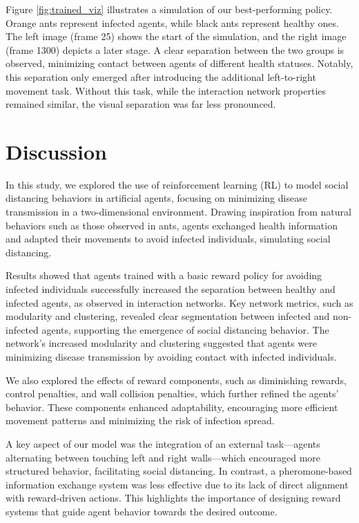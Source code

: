 \documentclass[9pt]{IEEEtran}
\begin{document}
Figure \ref{fig:trained_viz} illustrates a simulation of our best-performing policy. Orange ants represent infected agents, while black ants represent healthy ones. The left image (frame 25) shows the start of the simulation, and the right image (frame 1300) depicts a later stage. A clear separation between the two groups is observed, minimizing contact between agents of different health statuses. Notably, this separation only emerged after introducing the additional left-to-right movement task. Without this task, while the interaction network properties remained similar, the visual separation was far less pronounced.

\section{Discussion}

In this study, we explored the use of reinforcement learning (RL) to model social distancing behaviors in artificial agents, focusing on minimizing disease transmission in a two-dimensional environment. Drawing inspiration from natural behaviors such as those observed in ants, agents exchanged health information and adapted their movements to avoid infected individuals, simulating social distancing. 

Results showed that agents trained with a basic reward policy for avoiding infected individuals successfully increased the separation between healthy and infected agents, as observed in interaction networks. Key network metrics, such as modularity and clustering, revealed clear segmentation between infected and non-infected agents, supporting the emergence of social distancing behavior. The network's increased modularity and clustering suggested that agents were minimizing disease transmission by avoiding contact with infected individuals. 

We also explored the effects of reward components, such as diminishing rewards, control penalties, and wall collision penalties, which further refined the agents’ behavior. These components enhanced adaptability, encouraging more efficient movement patterns and minimizing the risk of infection spread.

A key aspect of our model was the integration of an external task—agents alternating between touching left and right walls—which encouraged more structured behavior, facilitating social distancing. In contrast, a pheromone-based information exchange system was less effective due to its lack of direct alignment with reward-driven actions. This highlights the importance of designing reward systems that guide agent behavior towards the desired outcome. 
\end{document}
